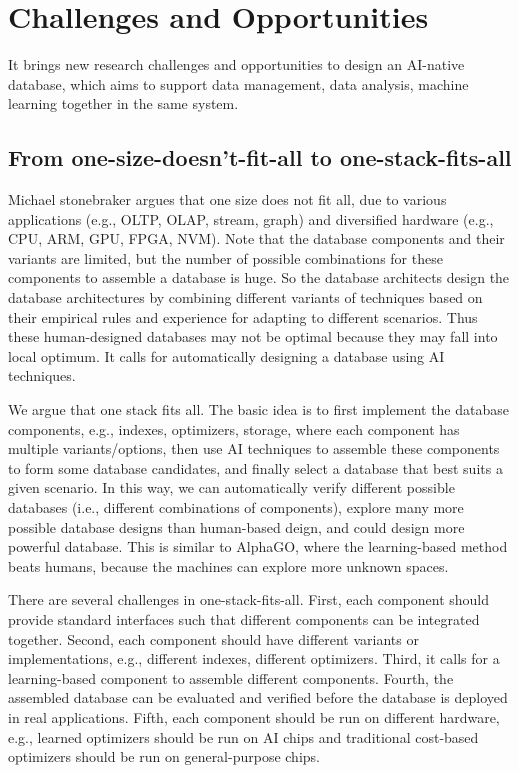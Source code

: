 
\section{Challenges and Opportunities}
\label{sec: challenge}

It brings new research challenges and opportunities to design an AI-native database, which aims to support data management, data analysis, machine learning together in the same system.

\subsection{From one-size-doesn't-fit-all to one-stack-fits-all}

Michael stonebraker argues that one size does not fit all, due to various applications (e.g., OLTP, OLAP, stream, graph) and diversified hardware (e.g., CPU, ARM, GPU, FPGA, NVM). Note that the database components and their variants are limited, but the number of possible combinations for these components to assemble a database is huge. So the database architects design the database architectures by combining different variants of techniques based on their empirical rules and experience for adapting to different scenarios. Thus these human-designed databases may not be optimal because they may fall into local optimum. It calls for automatically designing a database using AI techniques. 

We argue that one stack fits all. The basic idea is to first implement the database components, e.g., indexes, optimizers, storage, where each component has multiple variants/options, then use AI techniques to assemble these components to form some database candidates, and finally select a database that best suits a given scenario. In this way, we can automatically verify different possible databases (i.e., different combinations of components), explore many more possible database designs than human-based deign, and could design more powerful database. This is similar to AlphaGO, where the learning-based method beats humans, because the machines can explore more unknown spaces. 


There are several challenges in one-stack-fits-all. First, each component should provide standard interfaces such that different components can be integrated together. Second, each component should have different variants or implementations, e.g., different indexes, different optimizers. Third, it calls for a learning-based component to assemble different components. Fourth, the assembled database can be evaluated and verified before the database is deployed in real applications.  Fifth, each component should be run on different hardware, e.g., learned optimizers should be run on AI chips and traditional cost-based optimizers should be run on general-purpose chips. 


